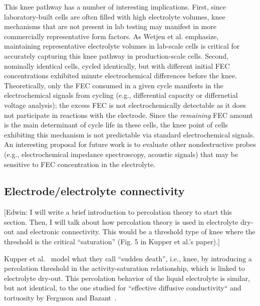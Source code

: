 \documentclass{article}
\newcommand{\pbox}[1]{{
\fbox{
\parbox{0.8\textwidth}{  \fbox{$\triangleright$\textcolor{blue}{\textbf{From Peter}:}} 
#1
}}}}
\begin{document}
This knee pathway has a number of interesting implications.
First, since laboratory-built cells are often filled with high electrolyte volumes, knee mechanisms that are not present in lab testing may manifest in more commercially representative form factors.
As Wetjen et al.\cite{wetjen_differentiating_2017} emphasize,
maintaining representative electrolyte volumes in lab-scale cells is critical for accurately capturing this knee pathway in production-scale cells.
Second, nominally identical cells, cycled identically, but with different initial FEC concentrations exhibited minute electrochemical differences before the knee.\cite{jung_consumption_2016}
Theoretically, only the FEC consumed in a given cycle manifests in the electrochemical signals from cycling (e.g., differential capacity or differnetial voltage analysis); the excess FEC is not electrochemically detectable as it does not participate in reactions with the electrode.
Since the \emph{remaining} FEC amount is the main determinant of cycle life in these cells, the knee point of cells exhibiting this mechanism is not predictable via standard electrochemical signals.
An interesting proposal for future work is to evaluate other nondestructive probes (e.g., electrochemical impedance spectroscopy\cite{zhang_identifying_2020}, acoustic signals\cite{knehr_understanding_2018}) that may be sensitive to FEC concentration in the electrolyte.

\subsection{Electrode/electrolyte connectivity}

\pbox{
Looks great, just need to complete
}

[Edwin: I will write a brief introduction to percolation theory to start this section. Then, I will talk about how percolation theory is used in electrolyte dry-out and electronic connectivity. This would be a threshold type of knee where the threshold is the critical ``saturation'' (Fig. 5 in Kupper et al.'s paper).]

Kupper et al.~\cite{kupper_end--life_2018} model what they call ``sudden death'', i.e., knee, by introducing a percolation threshold in the activity-saturation relationship, which is linked to electrolyte dry-out. This percolation behavior of the liquid electrolyte is similar, but not identical, to the one studied for ``effective diffusive conductivity`` and tortuosity by Ferguson and Bazant~\cite{ferguson_nonequilibrium_2012}.
\end{document}
